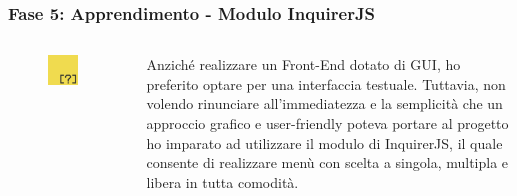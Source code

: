\documentclass{beamer}
\begin{document}
\begin{frame}
	\frametitle{Fase 5: Apprendimento - Modulo InquirerJS}
	\begin{columns}
			\begin{figure}
				\includegraphics[width=0.80\textwidth]{figures/inquirer.png}
			\end{figure}
		Anziché realizzare un Front-End dotato di GUI, ho preferito optare per una interfaccia testuale. Tuttavia, non volendo rinunciare all’immediatezza e la semplicità che un approccio grafico e user-friendly poteva portare al progetto ho imparato ad utilizzare il modulo di InquirerJS, il quale consente di realizzare menù con scelta a singola, multipla e libera in tutta comodità.
	\end{columns}
\end{frame}
\end{document}
